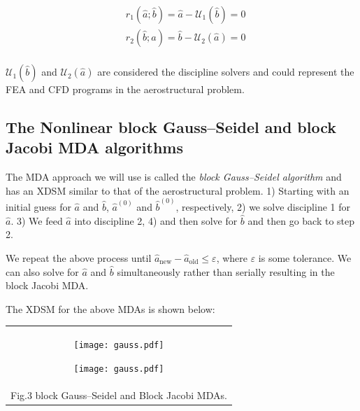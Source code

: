 \documentclass[11pt]{article}
\begin{document}
\begin{align*}
    & r_1(\hat{a};\hat{b}) = \hat{a} - \mathcal{U}_1(\hat{b}) = 0\\
    & r_2(\hat{b};\hat{a}) = \hat{b} - \mathcal{U}_2(\hat{a}) = 0\\
\end{align*}

\(\mathcal{U}_1(\hat{b})\) and \(\mathcal{U}_2(\hat{a})\) are considered
the discipline solvers and could represent the FEA and CFD programs in
the aerostructural problem.

    \hypertarget{the-nonlinear-block-gaussseidel-and-block-jacobi-mda-algorithms}{%
\subsection{The Nonlinear block Gauss--Seidel and block Jacobi MDA
algorithms}\label{the-nonlinear-block-gaussseidel-and-block-jacobi-mda-algorithms}}

The MDA approach we will use is called the \emph{block Gauss--Seidel
algorithm} and has an XDSM similar to that of the aerostructural
problem. 1) Starting with an initial guess for \(\hat{a}\) and
\(\hat{b}\), \(\hat{a}^{(0)}\) and \(\hat{b}^{(0)}\), respectively, 2)
we solve discipline 1 for \(\hat{a}\). 3) We feed \(\hat{a}\) into
discipline 2, 4) and then solve for \(\hat{b}\) and then go back to step
2.

We repeat the above process until
\(\hat{a}_\mathrm{new} - \hat{a}_\mathrm{old} \leq \varepsilon\), where
\(\varepsilon\) is some tolerance. We can also solve for \(\hat{a}\) and
\(\hat{b}\) simultaneously rather than serially resulting in the block
Jacobi MDA.

The XDSM for the above MDAs is shown below:

\begin{longtable}[]{@{}c@{}}
\toprule
\endhead
\begin{minipage}[t]{0.97\columnwidth}\centering
    \begin{figure}
        \centering
        \texttt{[image: gauss.pdf]}
    \end{figure}
    \begin{figure}
        \centering
        \texttt{[image: gauss.pdf]}
    \end{figure}
\end{minipage}\tabularnewline
Fig.3 block Gauss--Seidel and Block Jacobi MDAs.\tabularnewline
\bottomrule
\end{longtable}
\end{document}
